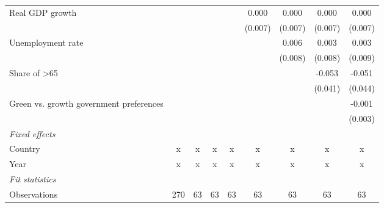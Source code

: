 \begin{table}[htbp]
\begin{tabular}{lcccccccc}
      Real GDP growth                                                          &         &         &               &                & 0.000          & 0.000          & 0.000          & 0.000\\   
                                                                               &         &         &               &                & (0.007)        & (0.007)        & (0.007)        & (0.007)\\   
      Unemployment rate                                                        &         &         &               &                &                & 0.006          & 0.003          & 0.003\\   
                                                                               &         &         &               &                &                & (0.008)        & (0.008)        & (0.009)\\   
      Share of >65                                                             &         &         &               &                &                &                & -0.053         & -0.051\\   
                                                                               &         &         &               &                &                &                & (0.041)        & (0.044)\\   
      Green vs. growth government preferences                                  &         &         &               &                &                &                &                & -0.001\\   
                                                                               &         &         &               &                &                &                &                & (0.003)\\   
      \emph{Fixed effects}\\
      Country                                                                  & x       & x       & x             & x              & x              & x              & x              & x\\  
      Year                                                                     & x       & x       & x             & x              & x              & x              & x              & x\\  
      \midrule \emph{Fit statistics}\\
      Observations                                                             & 270     & 63      & 63            & 63             & 63             & 63             & 63             & 63\\  

\end{tabular}
\end{table}
